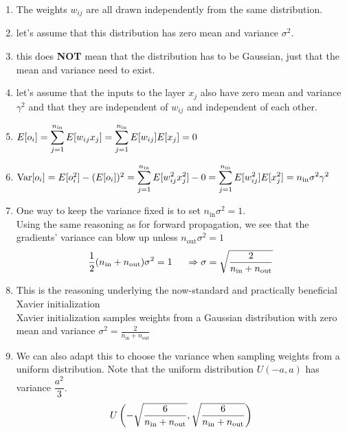 \begin{enumerate}[itemsep=0.2cm]
    \item The weights $w_{ij}$ are all drawn independently from the same distribution.
    
    \item let’s assume that this distribution has zero mean and variance $\sigma^2$.
    
    \item this does \textbf{NOT} mean that the distribution has to be Gaussian, just that the mean and variance need to exist.

    \item let’s assume that the inputs to the layer $x_j$ also have zero mean and variance $\gamma^2$ and that they are independent of $w_{ij}$ and independent of each other.

    \item[] 
    $
        \hfill
        E[o_i] 
        = \dsum_{j=1}^{n_\textrm{in}} E[w_{ij} x_j]
        = \dsum_{j=1}^{n_\textrm{in}} E[w_{ij}] E[x_j]
        = 0 
        \hfill
    $

    \item[] 
    $
        \hfill
        \textrm{Var}[o_i] 
        = E[o_i^2] - (E[o_i])^2
        = \dsum_{j=1}^{n_\textrm{in}} E[w^2_{ij} x^2_j] - 0
        = \dsum_{j=1}^{n_\textrm{in}} E[w^2_{ij}] E[x^2_j] 
        = n_\textrm{in} \sigma^2 \gamma^2
        \hfill
    $

    \item One way to keep the variance fixed is to set $n_\textrm{in} \sigma^2 = 1$. \\
    Using the same reasoning as for forward propagation, we see that the gradients’ variance can blow up unless $n_\textrm{out} \sigma^2 = 1$
    \[
        \hfill
        \dfrac{1}{2} (n_\textrm{in} + n_\textrm{out}) \sigma^2 = 1 
        \hspace{0.5cm}
        \Rightarrow
        \sigma = \sqrt{\dfrac{2}{n_\textrm{in} + n_\textrm{out}}}
        \hfill
    \]

    \item This is the reasoning underlying the now-standard and practically beneficial Xavier initialization\\
    Xavier initialization samples weights from a Gaussian distribution with zero mean and variance $\sigma^2 = \frac{2}{n_\textrm{in} + n_\textrm{out}}$

    \item We can also adapt this to choose the variance when sampling weights from a uniform distribution. Note that the uniform distribution $U(-a, a)$ has variance $\dfrac{a^2}{3}$.
    \[
        \hfill
        U\dParenBrac{
            -\sqrt{\dfrac{6}{n_\textrm{in} + n_\textrm{out}}}, 
            \sqrt{\dfrac{6}{n_\textrm{in} + n_\textrm{out}}}
        }
        \hfill
    \]
\end{enumerate}
